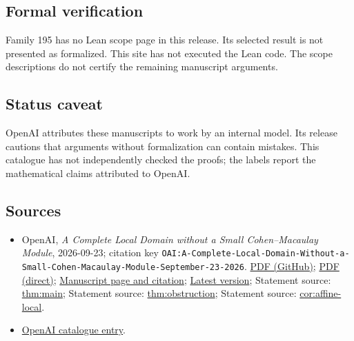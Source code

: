 \documentclass[11pt]{article}
\begin{document}
\subsection{Formal verification}
Family 195 has no Lean scope page in this release. Its selected result is not presented as formalized. This site has not executed the Lean code. The scope descriptions do not certify the remaining manuscript arguments.

\subsection{Status caveat}
OpenAI attributes these manuscripts to work by an internal model. Its release cautions that arguments without formalization can contain mistakes. This catalogue has not independently checked the proofs; the labels report the mathematical claims attributed to OpenAI.

\subsection{Sources}
\begin{itemize}
\item OpenAI, \emph{A Complete Local Domain without a Small Cohen–Macaulay Module}, 2026-09-23; citation key \texttt{OAI:A-Complete-Local-Domain-Without-a-Small-Cohen-Macaulay-Module-September-23-2026}. \href{https://github.com/openai/math/blob/adc7f1241b42e322a6451854ab7e4b4c146bf78a/preprints/A-Complete-Local-Domain-Without-a-Small-Cohen-Macaulay-Module-September-23-2026/paper.pdf}{PDF (GitHub)}; \href{https://github.com/openai/math/raw/adc7f1241b42e322a6451854ab7e4b4c146bf78a/preprints/A-Complete-Local-Domain-Without-a-Small-Cohen-Macaulay-Module-September-23-2026/paper.pdf}{PDF (direct)}; \href{https://github.com/openai/math/blob/adc7f1241b42e322a6451854ab7e4b4c146bf78a/preprints/A-Complete-Local-Domain-Without-a-Small-Cohen-Macaulay-Module-September-23-2026/README.md}{Manuscript page and citation}; \href{https://github.com/openai/math/blob/main/preprints/A-Complete-Local-Domain-Without-a-Small-Cohen-Macaulay-Module-September-23-2026/paper.pdf}{Latest version}; Statement source: \href{https://github.com/openai/math/blob/adc7f1241b42e322a6451854ab7e4b4c146bf78a/preprints/A-Complete-Local-Domain-Without-a-Small-Cohen-Macaulay-Module-September-23-2026/build/paper.tex\#L54}{thm:main}; Statement source: \href{https://github.com/openai/math/blob/adc7f1241b42e322a6451854ab7e4b4c146bf78a/preprints/A-Complete-Local-Domain-Without-a-Small-Cohen-Macaulay-Module-September-23-2026/build/paper.tex\#L119}{thm:obstruction}; Statement source: \href{https://github.com/openai/math/blob/adc7f1241b42e322a6451854ab7e4b4c146bf78a/preprints/A-Complete-Local-Domain-Without-a-Small-Cohen-Macaulay-Module-September-23-2026/build/paper.tex\#L646}{cor:affine-local}.
\item \href{https://github.com/openai/math/blob/adc7f1241b42e322a6451854ab7e4b4c146bf78a/CONTENTS.md}{OpenAI catalogue entry}.
\end{itemize}
\end{document}
